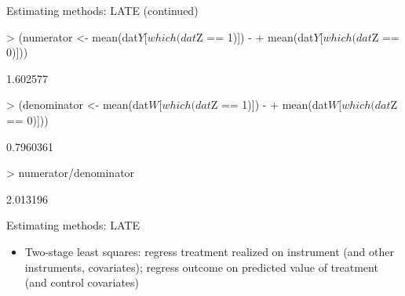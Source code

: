 \documentclass[xcolor={dvipsnames},handout]{beamer}
\begin{document}
\begin{frame}[fragile]{Estimating methods: LATE (continued)}
\begin{Schunk}
\begin{Sinput}
> (numerator <- mean(dat$Y[which(dat$Z == 1)]) -
+    mean(dat$Y[which(dat$Z == 0)]))
\end{Sinput}
\begin{Soutput}
[1] 1.602577
\end{Soutput}
\begin{Sinput}
> (denominator <- mean(dat$W[which(dat$Z == 1)]) -
+     mean(dat$W[which(dat$Z == 0)]))
\end{Sinput}
\begin{Soutput}
[1] 0.7960361
\end{Soutput}
\begin{Sinput}
> numerator/denominator
\end{Sinput}
\begin{Soutput}
[1] 2.013196
\end{Soutput}
\end{Schunk}





\end{frame}



\begin{frame}{Estimating methods: LATE}

\begin{itemize}
\item Two-stage least squares: regress treatment realized on instrument (and other instruments, covariates); regress outcome on predicted value of treatment (and control covariates)
\end{itemize}

\end{frame}


\end{document}
